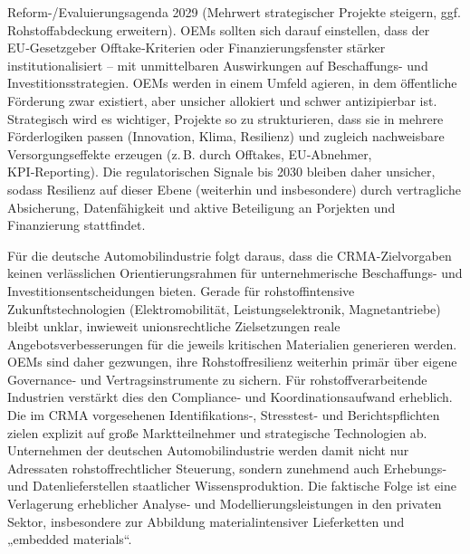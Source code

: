 \documentclass[12pt,a4paper,oneside]{book} %
\begin{document}
Reform-/Evaluierungsagenda 2029 (Mehrwert strategischer Projekte steigern, ggf. Rohstoffabdeckung erweitern). OEMs sollten sich darauf einstellen, dass der EU‑Gesetzgeber Offtake‑Kriterien oder Finanzierungsfenster stärker institutionalisiert – mit unmittelbaren Auswirkungen auf Beschaffungs- und Investitionsstrategien. OEMs werden in einem Umfeld agieren, in dem öffentliche Förderung zwar existiert, aber unsicher allokiert und schwer antizipierbar ist. Strategisch wird es wichtiger, Projekte so zu strukturieren, dass sie in mehrere Förderlogiken passen (Innovation, Klima, Resilienz) und zugleich nachweisbare Versorgungseffekte erzeugen (z. B. durch Offtakes, EU‑Abnehmer, KPI‑Reporting). Die regulatorischen Signale bis 2030 bleiben daher unsicher, sodass Resilienz auf dieser Ebene (weiterhin und insbesondere) durch vertragliche Absicherung, Datenfähigkeit und aktive Beteiligung an Porjekten und Finanzierung stattfindet.

Für die deutsche Automobilindustrie folgt daraus, dass die CRMA-Zielvorgaben keinen verlässlichen Orientierungsrahmen für unternehmerische Beschaffungs- und Investitionsentscheidungen bieten. Gerade für rohstoffintensive Zukunftstechnologien (Elektromobilität, Leistungselektronik, Magnetantriebe) bleibt unklar, inwieweit unionsrechtliche Zielsetzungen reale Angebotsverbesserungen für die jeweils kritischen Materialien generieren werden. OEMs sind daher gezwungen, ihre Rohstoffresilienz weiterhin primär über eigene Governance‑ und Vertragsinstrumente zu sichern. Für rohstoffverarbeitende Industrien verstärkt dies den Compliance‑ und Koordinationsaufwand erheblich. Die im CRMA vorgesehenen Identifikations‑, Stresstest- und Berichtspflichten zielen explizit auf große Marktteilnehmer und strategische Technologien ab. Unternehmen der deutschen Automobilindustrie werden damit nicht nur Adressaten rohstoffrechtlicher Steuerung, sondern zunehmend auch Erhebungs- und Datenlieferstellen staatlicher Wissensproduktion. Die faktische Folge ist eine Verlagerung erheblicher Analyse‑ und Modellierungsleistungen in den privaten Sektor, insbesondere zur Abbildung materialintensiver Lieferketten und „embedded materials“.
\end{document}
